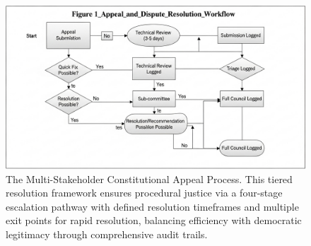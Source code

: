 \documentclass[manuscript,screen,9pt]{acmart}
\begin{document}
\FloatBarrier %
\begin{figure}[!htb]
\centering
\includegraphics[width=0.95\linewidth,height=0.65\textheight,keepaspectratio]{figs/Figure_1_Appeal_and_Dispute_Resolution_Workflow.png}
\caption[Multi-Stakeholder Constitutional Appeal Process]{The Multi-Stakeholder Constitutional Appeal Process. This tiered resolution framework ensures procedural justice via a four-stage escalation pathway with defined resolution timeframes and multiple exit points for rapid resolution, balancing efficiency with democratic legitimacy through comprehensive audit trails.}
\label{fig:appeal_workflow}
\end{figure}
\end{document}
